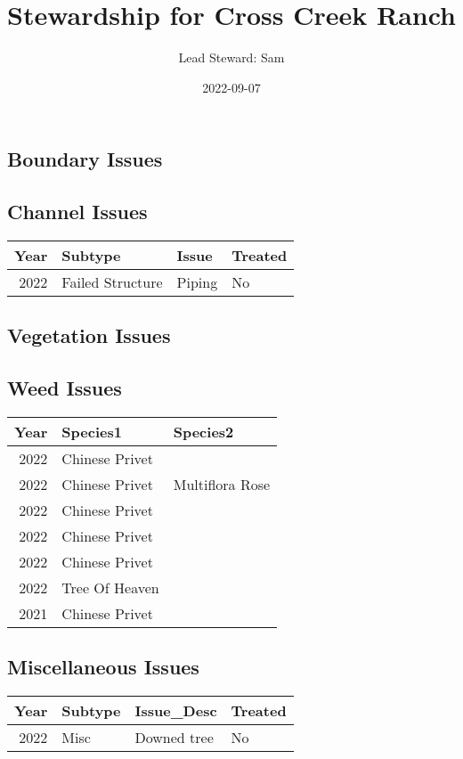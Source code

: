\documentclass[
]{article}
\title{Stewardship for Cross Creek Ranch}
\author{Lead Steward: Sam}
\date{2022-09-07}
\begin{document}
\maketitle

\hypertarget{boundary-issues}{%
\subsection{Boundary Issues}\label{boundary-issues}}

\textbar\textbar{} \textbar\textbar{} \textbar\textbar{}
\textbar\textbar{}

\hypertarget{channel-issues}{%
\subsection{Channel Issues}\label{channel-issues}}

\begin{longtable}[]{@{}rlll@{}}
\toprule()
Year & Subtype & Issue & Treated \\
\midrule()
\endhead
2022 & Failed Structure & Piping & No \\
\bottomrule()
\end{longtable}

\hypertarget{vegetation-issues}{%
\subsection{Vegetation Issues}\label{vegetation-issues}}

\textbar\textbar{} \textbar\textbar{} \textbar\textbar{}
\textbar\textbar{}

\hypertarget{weed-issues}{%
\subsection{Weed Issues}\label{weed-issues}}

\begin{longtable}[]{@{}rll@{}}
\toprule()
Year & Species1 & Species2 \\
\midrule()
\endhead
2022 & Chinese Privet & \\
2022 & Chinese Privet & Multiflora Rose \\
2022 & Chinese Privet & \\
2022 & Chinese Privet & \\
2022 & Chinese Privet & \\
2022 & Tree Of Heaven & \\
2021 & Chinese Privet & \\
\bottomrule()
\end{longtable}

\hypertarget{miscellaneous-issues}{%
\subsection{Miscellaneous Issues}\label{miscellaneous-issues}}

\begin{longtable}[]{@{}rlll@{}}
\toprule()
Year & Subtype & Issue\_Desc & Treated \\
\midrule()
\endhead
2022 & Misc & Downed tree & No \\
\bottomrule()
\end{longtable}
\end{document}
